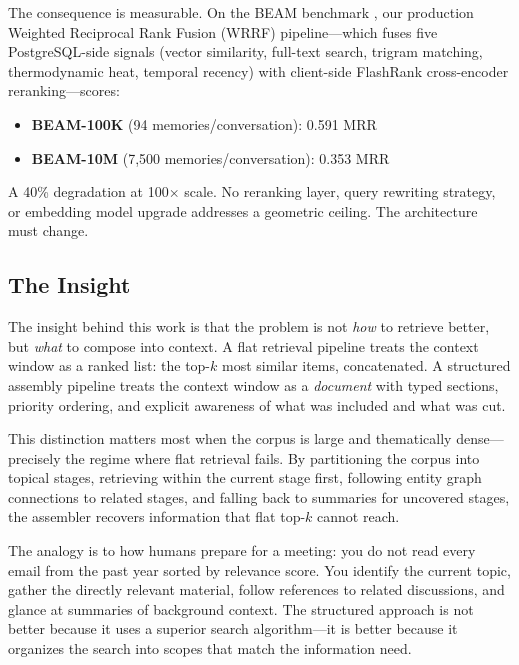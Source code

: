 \documentclass[11pt]{article}
\begin{document}
The consequence is measurable.  On the BEAM benchmark
\citep{Tavakoli2026}, our production Weighted Reciprocal Rank Fusion
(WRRF) pipeline---which fuses five PostgreSQL-side signals (vector
similarity, full-text search, trigram matching, thermodynamic heat,
temporal recency) with client-side FlashRank cross-encoder reranking---scores:

\begin{itemize}
  \item \textbf{BEAM-100K} (94 memories/conversation): 0.591 MRR
  \item \textbf{BEAM-10M} (7,500 memories/conversation): 0.353 MRR
\end{itemize}

A 40\% degradation at 100$\times$ scale.  No reranking layer, query
rewriting strategy, or embedding model upgrade addresses a geometric
ceiling.  The architecture must change.

\subsection{The Insight}
\label{sec:insight}

The insight behind this work is that the problem is not \emph{how} to
retrieve better, but \emph{what} to compose into context.  A flat
retrieval pipeline treats the context window as a ranked list: the
top-$k$ most similar items, concatenated.  A structured assembly
pipeline treats the context window as a \emph{document} with typed
sections, priority ordering, and explicit awareness of what was
included and what was cut.

This distinction matters most when the corpus is large and
thematically dense---precisely the regime where flat retrieval fails.
By partitioning the corpus into topical stages, retrieving within the
current stage first, following entity graph connections to related
stages, and falling back to summaries for uncovered stages, the
assembler recovers information that flat top-$k$ cannot reach.

The analogy is to how humans prepare for a meeting: you do not read
every email from the past year sorted by relevance score.  You
identify the current topic, gather the directly relevant material,
follow references to related discussions, and glance at summaries of
background context.  The structured approach is not better because
it uses a superior search algorithm---it is better because it
organizes the search into scopes that match the information need.
\end{document}
